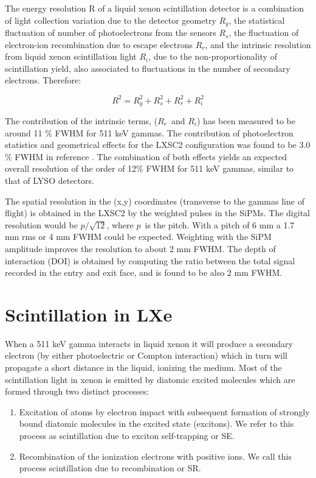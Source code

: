 \documentclass[review]{elsarticle}
\begin{document}
The energy resolution R of a liquid xenon scintillation detector is a combination of light collection variation due to the detector geometry $R_g$, the statistical fluctuation of number of photoelectrons from the sensors $R_s$, the fluctuation of electron-ion recombination due to escape electrons $R_r$, and the intrinsic resolution from liquid xenon scintillation light $R_i$, due to the non-proportionality of scintillation yield, also associated to fluctuations in the number of secondary electrons. Therefore:

\begin{equation}
R^2 = R_g^2 + R_s^2 + R_r^2 + R_i^2
\end{equation}

The contribution of the intrinsic terms, ($R_r$~and $R_i$) has been measured to be
around 11 \% FWHM \cite{aprileRes} for 511 keV gammas. The contribution of photoelectron statistics and geometrical effects for the LXSC2 configuration was found to be 3.0 \% FWHM
in reference \cite{Petalo2015}. The combination of both effects yields an expected 
overall resolution of the order of 12\% FWHM for 511 keV gammas, similar to that of LYSO detectors. 

The spatial resolution in the (x,y) coordinates (transverse to the gammas line of flight) is obtained in the LXSC2 by the weighted pulses in the SiPMs. The digital resolution would be
$p/\sqrt{12}$, where $p$~is the pitch. With a pitch of 6 mm a 1.7 mm rms or 4 mm FWHM could be expected. Weighting with the SiPM amplitude improves the resolution to about 2 mm FWHM. The depth of interaction (DOI) is obtained by computing the ratio between the
total signal recorded in the entry and exit face, and is found to be also 2 mm FWHM. 

\section{Scintillation in LXe} \label{sec.scint}

When a 511 keV gamma interacts in liquid xenon it will produce a secondary electron (by either photoelectric or Compton interaction) which in turn will propagate a short distance in the liquid, ionizing the medium. Most of the scintillation light in xenon is emitted by diatomic excited molecules which are formed through two distinct processes:
\begin{enumerate}
\item Excitation of atoms by electron impact with subsequent formation of strongly bound diatomic molecules in the excited state (excitons). We refer to this process as scintillation due to exciton self-trapping or SE.
\item Recombination of the ionization electrons with positive ions. We call this process scintillation due to recombination or SR. 
\end{enumerate}
\end{document}
